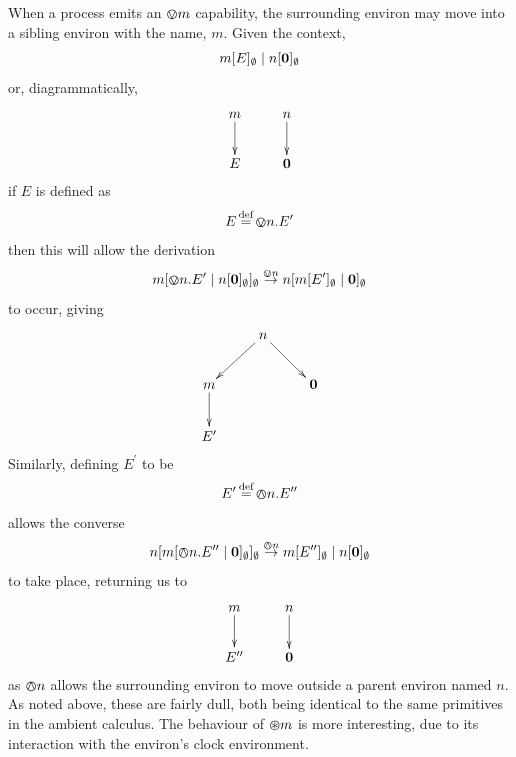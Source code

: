 When a process emits an $\varovee m$ capability, the surrounding environ
may move into a sibling environ with the name, $m$.  Given the context,
\begin{equation}
{m}[ E ]_{\emptyset}\;|\;{n}[ \textbf{0} ]_{\emptyset}
\end{equation}
or, diagrammatically,
\[\CompileMatrices
\xymatrix{
m \ar@{->}[d] &
n \ar@{->}[d] \\
E & \nil \\
}
\]
if $E$ is defined as
\begin{equation}
E \operatorname{\stackrel{\textrm{def}}{=}} \varovee n.E^\prime
\end{equation}
then this will allow the derivation
\begin{equation}
{m}[ \varovee n.E^\prime \;|\; {n}[ \textbf{0} ]_{\emptyset} ]_{\emptyset} \stackrel{\varovee n}{\rightarrow} 
{n}[ {m}[ E^\prime ]_{\emptyset} \;|\; \textbf{0} ]_{\emptyset}
\end{equation}
to occur, giving
\[\CompileMatrices
\xymatrix{
&
n \ar@{->}[ld] \ar@{->}[rd] & \\
m \ar@{->}[d] & & \nil \\
E' & &
}
\]
Similarly, defining $E^\prime$ to be
\begin{equation}
E^\prime \operatorname{\stackrel{\textrm{def}}{=}} \varowedge n.E^{\prime\prime}
\end{equation}
allows the converse
\begin{equation}
{n}[ {m}[ \varowedge n.E^{\prime\prime} \;|\; \textbf{0} ]_{\emptyset} ]_{\emptyset} \stackrel{\varowedge n}{\rightarrow}
{m}[ E^{\prime\prime} ]_{\emptyset} \;|\; {n}[ \textbf{0} ]_{\emptyset}
\end{equation}
to take place, returning us to
\[\CompileMatrices
\xymatrix{
m \ar@{->}[d] &
n \ar@{->}[d] \\
E^{\prime\prime} & \nil \\
}
\]
as $\varowedge n$ allows the surrounding environ to move outside a
parent environ named $n$.  As noted above, these are fairly dull, both
being identical to the same primitives in the ambient calculus.  The
behaviour of $\varoast m$ is more interesting, due to its interaction
with the environ's clock environment.


